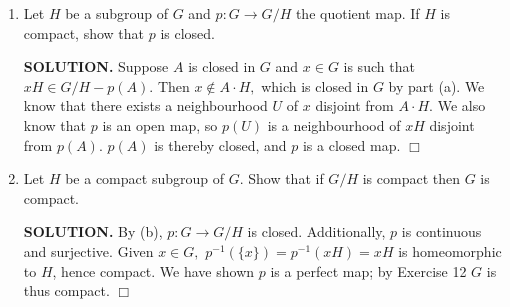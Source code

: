 \documentclass{article}
\begin{document}
\begin{enumerate}
\begin{enumerate}
        \item Let $H$ be a subgroup of $G$ and $p: G \rightarrow G/H$ the quotient map. If $H$ is compact, show that $p$ is closed.

        {\bf SOLUTION.} Suppose $A$ is closed in $G$ and $x \in G$ is such that $xH \in G/H - p(A).$ Then $x \notin A \cdot H,$ which is closed in $G$ by part (a). We know that there exists a neighbourhood $U$ of $x$ disjoint from $A \cdot H$. We also know that $p$ is an open map, so $p(U)$ is a neighbourhood of $xH$ disjoint from $p(A).$ $p(A)$ is thereby closed, and $p$ is a closed map. $\Box$

        \item Let $H$ be a compact subgroup of $G.$ Show that if $G/H$ is compact then $G$ is compact.

        {\bf SOLUTION.} By (b), $p: G \rightarrow G/H$ is closed. Additionally, $p$ is continuous and surjective. Given $x \in G,$ $p^{-1}(\{x\}) = p^{-1}(xH) = xH$ is homeomorphic to $H$, hence compact. We have shown $p$ is a perfect map; by Exercise 12 $G$ is thus compact. $\Box$
    \end{enumerate}
\end{enumerate}
\end{document}
